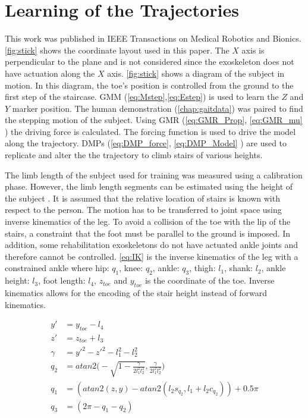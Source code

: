 \section{Learning of the Trajectories}
This work was published in IEEE Transactions on Medical Robotics and Bionics\cite{goldfarb2021towards}. \autoref{fig:stick} shows the coordinate layout used in this paper. The $X$ axis is perpendicular to the plane and is not considered since the exoskeleton does not have actuation along the $X$ axis. \autoref{fig:stick} shows a diagram of the subject in motion. In this diagram, the toe's position is controlled from the ground to the first step of the staircase. GMM (\autoref{eq:Mstep},\autoref{eq:Estep}) is used to learn the $Z$ and $Y$ marker position. The human demonstration (\autoref{chap:gaitdata}) was paired to find the stepping motion of the subject. Using GMR (\autoref{eq:GMR_Prop}, \autoref{eq:GMR_mu} ) the driving force is calculated. The forcing function is used to drive the model along the trajectory. DMPs (\autoref{eq:DMP_force}, \autoref{eq:DMP_Model} ) are used to replicate and alter the the trajectory to climb stairs of various heights.  


The limb length of the subject used for training was measured using a calibration phase. However, the limb length segments can be estimated using the height of the subject \cite{anthropomorphic}. It is assumed that the relative location of stairs is known with respect to the person. The motion has to be transferred to joint space using inverse kinematics of the leg. To avoid a collision of the toe with the lip of the stairs, a constraint that the foot must be parallel to the ground is imposed. In addition, some rehabilitation exoskeletons do not have actuated ankle joints and therefore cannot be controlled.  \autoref{eq:IK} is the inverse kinematics of the leg with a constrained ankle where hip: $q_1$, knee: $q_2$, ankle: $q_3$, thigh: $l_1$, shank: $l_2$, ankle height: $l_3$, foot length: $l_4$, $z_{toe}$ and $y_{toe}$ is the coordinate of the toe. Inverse kinematics allows for the encoding of the stair height instead of forward kinematics. 

\begin{equation} 
    \begin{aligned} 
        y' &= y_{toe} - l_4 \\ 
        z' &= z_{toe} + l_3 \\  
        \gamma &= y'^2 - z'^2 - l_1^2  - l_2^2 \\ 
        q_2 &= atan2 \Bigg( -\sqrt{1 - \frac{\gamma }{2 l_1^2 l_2^2}}, \frac{\gamma}{2 l_1^2 l_2^2}\Bigg)\\ 
        q_1 &= (atan2(z, y) - atan2( l_2 s_{q_2}, l_1 + l_2 c_{q_2})) + 0.5\pi \\ 
        q_3 &= (2\pi - q_1 - q_2) 
    \end{aligned} 
    \label{eq:IK} 
\end{equation} 

